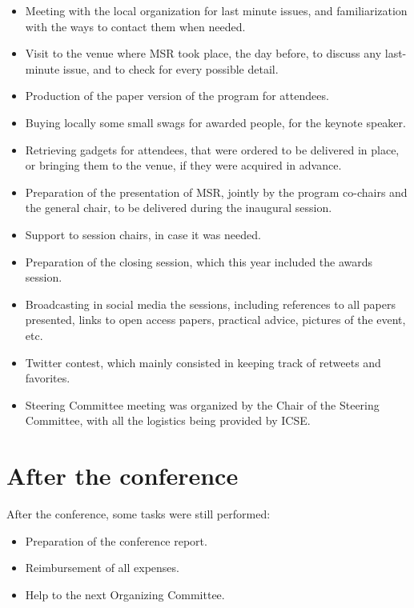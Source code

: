 \documentclass[a4paper]{report}
\begin{document}
\begin{itemize}
\item Meeting with the local organization for last minute issues, and familiarization with the ways to contact them when needed.
\item Visit to the venue where MSR took place, the day before, to discuss any last-minute issue, and to check for every possible detail.
\item Production of the paper version of the program for attendees.
\item Buying locally some small swags for awarded people, for the keynote speaker.
\item Retrieving gadgets for attendees, that were ordered to be delivered in place, or bringing them to the venue, if they were acquired in advance.
\item Preparation of the presentation of MSR, jointly by the program co-chairs and the general chair, to be delivered during the inaugural session.
\item Support to session chairs, in case it was needed.
\item Preparation of the closing session, which this year included the awards session.
\item Broadcasting in social media the sessions, including references to all papers presented, links to open access papers, practical advice, pictures of the event, etc.
\item Twitter contest, which mainly consisted in keeping track of retweets and favorites.
\item Steering Committee meeting was organized by the Chair of the Steering Committee, with all the logistics being provided by ICSE.
\end{itemize}

\section{After the conference}

After the conference, some tasks were still performed:

\begin{itemize}
\item Preparation of the conference report.
\item Reimbursement of all expenses.
\item Help to the next Organizing Committee.
\end{itemize}
\end{document}
